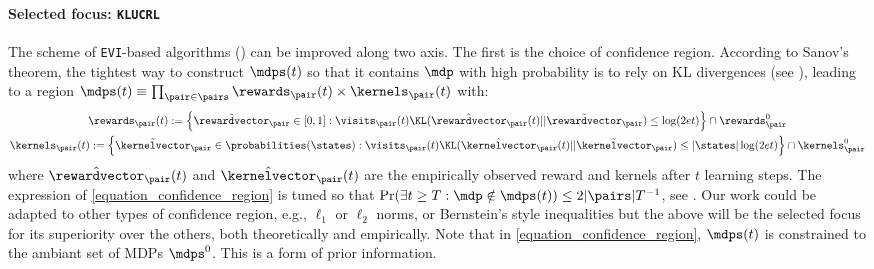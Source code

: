 \documentclass[preprint,cleveref,12pt]{colt2025}
\DeclarePairedDelimiter{\braces}{\{}{\}}	%
\DeclarePairedDelimiter{\abs}{\lvert}{\rvert}	%
\def\model{\mdp}
\def\models{\mdps}
\def\kernel{\kernelvector}
\def\reward{\rewardvector}
\begin{document}
    \paragraph{Selected focus: \texttt{KLUCRL}}
    The scheme of \texttt{EVI}-based algorithms () can be improved along two axis. 
    The first is the choice of confidence region.
    According to Sanov's theorem, the tightest way to construct $\models(t)$ so that it contains $\model$ with high probability is to rely on KL divergences (see ), leading to a region $\models(t) \equiv \prod_{\pair \in \pairs} \rewards_\pair(t) \times \kernels_\pair(t)$ with:
    \begin{equation}
    \label{equation_confidence_region}
    \begin{gathered}
        \rewards_\pair(t)
        := 
        \braces*{
            \tilde{\reward}_\pair \in [0, 1]
            :
            \visits_\pair (t)
            \KL(\hat{\reward}_\pair(t)||\tilde{\reward}_\pair)
            \le
            \log(2 e t)
        }
        \cap 
        \rewards_\pair^0
        \\
        \kernels_\pair(t)
        := 
        \braces*{
            \tilde{\kernel}_\pair \in \probabilities(\states)
            :
            \visits_\pair (t)
            \KL(\hat{\kernel}_\pair(t)||\tilde{\kernel}_\pair)
            \le
            \abs{\states} \log(2 e t)
        }
        \cap
        \kernels_\pair^0
    \end{gathered}
    \end{equation}
    where $\hat{\reward}_\pair (t)$ and $\hat{\kernel}_\pair (t)$ are the {empirically} observed reward and kernels after $t$ learning steps. 
    The expression of \eqref{equation_confidence_region} is tuned so that $\Pr(\exists t \ge T: \model \notin \models(t)) \le {2\abs{\pairs}}T^{-1}$, see .
    Our work could be adapted to other types of confidence region, e.g., $\ell_1$ or $\ell_2$ norms, or Bernstein's style inequalities but the above will be the selected focus for its superiority over the others, both theoretically and empirically.
    Note that in \eqref{equation_confidence_region}, $\models(t)$ is constrained to the ambiant set of MDPs $\models^0$.
    This is a form of prior information. 
\end{document}
